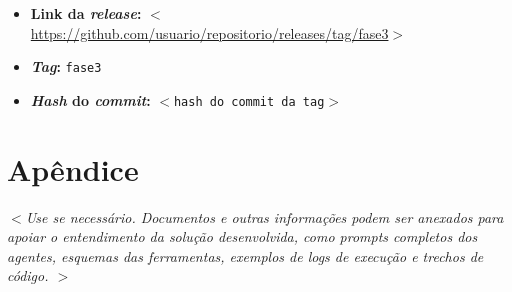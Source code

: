 \documentclass[12pt]{article}
\begin{document}
\begin{itemize}
    \item \textbf{Link da \textit{release}:} $<$\url{https://github.com/usuario/repositorio/releases/tag/fase3}$>$
    \item \textbf{\textit{Tag}:} \texttt{fase3}
    \item \textbf{\textit{Hash} do \textit{commit}:} \texttt{$<$hash do commit da tag$>$}
\end{itemize}

\section*{Apêndice}
\label{sec:anexo}

\textit{$<$Use se necessário. Documentos e outras informações podem ser anexados para apoiar o entendimento da solução desenvolvida, como \textit{prompts} completos dos agentes, esquemas das ferramentas, exemplos de \textit{logs} de execução e trechos de código. $>$}



\newpage

{}
\end{document}
